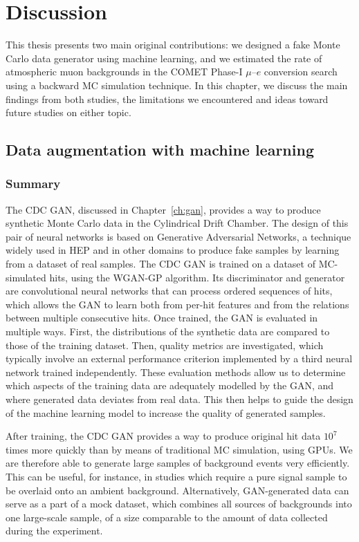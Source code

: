 \chapter{Discussion}

This thesis presents two main original contributions: we designed a fake Monte
Carlo data generator using machine learning, and we estimated the rate of
atmospheric muon backgrounds in the COMET Phase-I $\mu$--$e$ conversion search
using a backward MC simulation technique. In this chapter, we discuss the main
findings from both studies, the limitations we encountered and ideas toward
future studies on either topic.

\section{Data augmentation with machine learning}
\subsection{Summary}
The CDC GAN, discussed in Chapter~\ref{ch:gan}, provides a way to produce
synthetic Monte Carlo data in the Cylindrical Drift Chamber. The design of this
pair of neural networks is based on Generative Adversarial Networks, a technique
widely used in HEP and in other domains to produce fake samples by learning from
a dataset of real samples. The CDC GAN is trained on a dataset of MC-simulated
hits, using the WGAN-GP algorithm. Its discriminator and generator are
convolutional neural networks that can process ordered sequences of hits, which
allows the GAN to learn both from per-hit features and from the relations
between multiple consecutive hits. 
Once trained, the GAN is evaluated in multiple ways. First, the distributions of
the synthetic data are compared to those of the training dataset. Then, quality
metrics are investigated, which typically involve an external performance criterion
implemented by a third neural network trained independently. These evaluation
methods allow us to determine which aspects of the training data are adequately
modelled by the GAN, and where generated data deviates from real data. This then
helps to guide the design of the machine learning model to increase the quality
of generated samples.

After training, the CDC GAN provides a way to produce original hit data $10^7$
times more quickly than by means of traditional MC simulation, using GPUs. We
are therefore able to generate large samples of background events very efficiently.
This can be useful, for instance, in studies which require a pure signal sample
to be overlaid onto an ambient background. Alternatively, GAN-generated data can
serve as a part of a mock dataset, which combines all sources of backgrounds
into one large-scale sample, of a size comparable to the amount of data
collected during the experiment.



